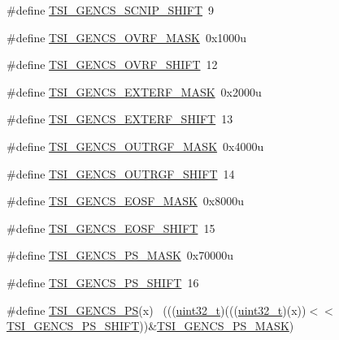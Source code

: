 \begin{DoxyCompactItemize}
\item 
\#define \hyperlink{group___t_s_i___register___masks_ga372b92d46c9f071d4fdee3edcc0d5219}{T\+S\+I\+\_\+\+G\+E\+N\+C\+S\+\_\+\+S\+C\+N\+I\+P\+\_\+\+S\+H\+I\+FT}~9
\item 
\#define \hyperlink{group___t_s_i___register___masks_ga9d9ee2965d913e5b2eb7a9a71a5c26e8}{T\+S\+I\+\_\+\+G\+E\+N\+C\+S\+\_\+\+O\+V\+R\+F\+\_\+\+M\+A\+SK}~0x1000u
\item 
\#define \hyperlink{group___t_s_i___register___masks_ga36164d96be108b8f9e9c9ba32db4363c}{T\+S\+I\+\_\+\+G\+E\+N\+C\+S\+\_\+\+O\+V\+R\+F\+\_\+\+S\+H\+I\+FT}~12
\item 
\#define \hyperlink{group___t_s_i___register___masks_ga33e3d274099483b6ebf7897b7d72b866}{T\+S\+I\+\_\+\+G\+E\+N\+C\+S\+\_\+\+E\+X\+T\+E\+R\+F\+\_\+\+M\+A\+SK}~0x2000u
\item 
\#define \hyperlink{group___t_s_i___register___masks_ga90ccee35b83ef31a092ad15e533e6396}{T\+S\+I\+\_\+\+G\+E\+N\+C\+S\+\_\+\+E\+X\+T\+E\+R\+F\+\_\+\+S\+H\+I\+FT}~13
\item 
\#define \hyperlink{group___t_s_i___register___masks_gae0670e2e8c0eb55717171acb5a2bebfe}{T\+S\+I\+\_\+\+G\+E\+N\+C\+S\+\_\+\+O\+U\+T\+R\+G\+F\+\_\+\+M\+A\+SK}~0x4000u
\item 
\#define \hyperlink{group___t_s_i___register___masks_gaa269027bdefea51eddd47bfc47140224}{T\+S\+I\+\_\+\+G\+E\+N\+C\+S\+\_\+\+O\+U\+T\+R\+G\+F\+\_\+\+S\+H\+I\+FT}~14
\item 
\#define \hyperlink{group___t_s_i___register___masks_ga820de7fe1ecba9a42260e304554b389f}{T\+S\+I\+\_\+\+G\+E\+N\+C\+S\+\_\+\+E\+O\+S\+F\+\_\+\+M\+A\+SK}~0x8000u
\item 
\#define \hyperlink{group___t_s_i___register___masks_ga9a2e8c68bfb60312ebdeea4f069d9086}{T\+S\+I\+\_\+\+G\+E\+N\+C\+S\+\_\+\+E\+O\+S\+F\+\_\+\+S\+H\+I\+FT}~15
\item 
\#define \hyperlink{group___t_s_i___register___masks_ga3c608c250c31872d206e9c18eea97799}{T\+S\+I\+\_\+\+G\+E\+N\+C\+S\+\_\+\+P\+S\+\_\+\+M\+A\+SK}~0x70000u
\item 
\#define \hyperlink{group___t_s_i___register___masks_gaae1f3b081a9c92fefe10bd3ec1f40734}{T\+S\+I\+\_\+\+G\+E\+N\+C\+S\+\_\+\+P\+S\+\_\+\+S\+H\+I\+FT}~16
\item 
\#define \hyperlink{group___t_s_i___register___masks_ga6edb5dbc41896c6d33fd1395d9e1a17d}{T\+S\+I\+\_\+\+G\+E\+N\+C\+S\+\_\+\+PS}(x)                                                ~(((\hyperlink{_p_e___types_8h_a33594304e786b158f3fb30289278f5af}{uint32\+\_\+t})(((\hyperlink{_p_e___types_8h_a33594304e786b158f3fb30289278f5af}{uint32\+\_\+t})(x))$<$$<$\hyperlink{group___t_s_i___register___masks_gaae1f3b081a9c92fefe10bd3ec1f40734}{T\+S\+I\+\_\+\+G\+E\+N\+C\+S\+\_\+\+P\+S\+\_\+\+S\+H\+I\+FT}))\&\hyperlink{group___t_s_i___register___masks_ga3c608c250c31872d206e9c18eea97799}{T\+S\+I\+\_\+\+G\+E\+N\+C\+S\+\_\+\+P\+S\+\_\+\+M\+A\+SK})
$$
\end{DoxyCompactItemize}
